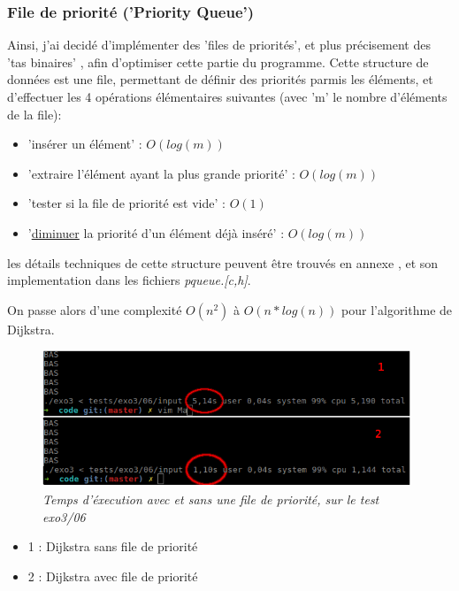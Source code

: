\documentclass[10pt]{article}
\begin{document}
			\subsubsection{File de priorité ('Priority Queue')}

				Ainsi, j'ai decidé d'implémenter des 'files de priorités', et plus précisement des
				'tas binaires' \cite{binary_heap}, afin d'optimiser cette partie du programme.
				Cette structure de données est une file, permettant de définir des priorités parmis les éléments,
				et d'effectuer les 4 opérations élémentaires suivantes (avec 'm' le nombre d'éléments de la file):
				\begin{itemize}[label=-]
					\item 'insérer un élément' : \(O(log(m))\)
					\item 'extraire l'élément ayant la plus grande priorité' : \({O(log(m))}\)
					\item 'tester si la file de priorité est vide' : \(O(1)\)
					\item '\underline{diminuer} la priorité d'un élément déjà inséré' : \(O(log(m))\)
				\end{itemize}
				les détails techniques de cette structure peuvent être trouvés en annexe \cite{binary_heap},
				et son implementation dans les fichiers \textit{pqueue.[c,h]}.
				
				On passe alors d'une complexité \(O(n^2)\) à \(O(n * log(n))\) pour l'algorithme de Dijkstra.

				\begin{figure}[H]
					\begin{center}
						\includegraphics[width=11cm,height=\textheight,keepaspectratio]{./images/performances.png}
					\end{center}
					\caption{\textit{Temps d'éxecution avec et sans une file de priorité, sur le test exo3/06}}
				\end{figure}
				
				\begin{itemize}[label=-]
					\setlength\itemsep{0.1em}
					\item 1 : Dijkstra sans file de priorité
					\item 2 : Dijkstra avec file de priorité
				\end{itemize}
\end{document}

